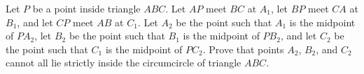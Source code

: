 Let $P$ be a point inside triangle $ABC$. Let $AP$ meet $BC$ at $A_1$, let $BP$ meet $CA$ at $B_1$, and let $CP$ meet $AB$ at $C_1$. Let $A_2$ be the point such that $A_1$ is the midpoint of $PA_2$, let $B_2$ be the point such that $B_1$ is the midpoint of $PB_2$, and let $C_2$ be the point such that $C_1$ is the midpoint of $PC_2$. Prove that points $A_2$, $B_2$, and $C_2$ cannot all lie strictly inside the circumcircle of triangle $ABC$.
